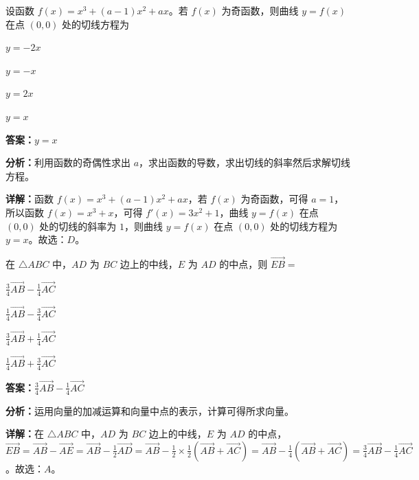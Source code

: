 \begin{question}[points=5]
设函数 $f(x)=x^3+(a-1)x^2+ax$。若 $f(x)$ 为奇函数，则曲线 $y=f(x)$ 在点 $(0,0)$ 处的切线方程为
\begin{choices}
  \item $y=-2x$
  \item $y=-x$
  \item $y=2x$
  \item $y=x$
\end{choices}
\begin{solution}
\textbf{答案：}$y=x$

\textbf{分析：}利用函数的奇偶性求出 $a$，求出函数的导数，求出切线的斜率然后求解切线方程。

\textbf{详解：}函数 $f(x)=x^3+(a-1)x^2+ax$，若 $f(x)$ 为奇函数，可得 $a=1$，所以函数 $f(x)=x^3+x$，可得 $f'(x)=3x^2+1$，曲线 $y=f(x)$ 在点 $(0,0)$ 处的切线的斜率为 $1$，则曲线 $y=f(x)$ 在点 $(0,0)$ 处的切线方程为 $y=x$。故选：$D$。
\end{solution}
\end{question}

\begin{question}[points=5]
在 $\triangle ABC$ 中，$AD$ 为 $BC$ 边上的中线，$E$ 为 $AD$ 的中点，则 $\overrightarrow{EB}=$
\begin{choices}
  \item $\frac{3}{4}\overrightarrow{AB}-\frac{1}{4}\overrightarrow{AC}$
  \item $\frac{1}{4}\overrightarrow{AB}-\frac{3}{4}\overrightarrow{AC}$
  \item $\frac{3}{4}\overrightarrow{AB}+\frac{1}{4}\overrightarrow{AC}$
  \item $\frac{1}{4}\overrightarrow{AB}+\frac{3}{4}\overrightarrow{AC}$
\end{choices}
\begin{solution}
\textbf{答案：}$\frac{3}{4}\overrightarrow{AB}-\frac{1}{4}\overrightarrow{AC}$

\textbf{分析：}运用向量的加减运算和向量中点的表示，计算可得所求向量。

\textbf{详解：}在 $\triangle ABC$ 中，$AD$ 为 $BC$ 边上的中线，$E$ 为 $AD$ 的中点，$\overrightarrow{EB}=\overrightarrow{AB}-\overrightarrow{AE}=\overrightarrow{AB}-\frac{1}{2}\overrightarrow{AD}=\overrightarrow{AB}-\frac{1}{2}\times\frac{1}{2}(\overrightarrow{AB}+\overrightarrow{AC})=\overrightarrow{AB}-\frac{1}{4}(\overrightarrow{AB}+\overrightarrow{AC})=\frac{3}{4}\overrightarrow{AB}-\frac{1}{4}\overrightarrow{AC}$。故选：$A$。
\end{solution}
\end{question}

